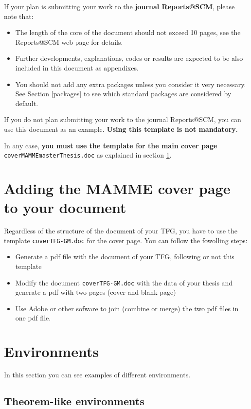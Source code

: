 \documentclass[12,twoside]{TFG-GM}
\theoremstyle{definition}
\theoremstyle{remark}
\begin{document}
If your plan is submitting your work to the \textbf{journal Reports@SCM}, please note that:
\begin{itemize}
	\item The length of the core of the document should not exceed 10 pages, see the Reports@SCM web page for details.
	\item Further developments, explanations, codes or results are expected to be also included in this document as appendixes.
	\item You should not add any extra packages unless you consider it very necessary. See Section \ref{packages} to see which standard packages  are considered by default. 
\end{itemize} 

If you do not plan submitting your work to the journal  Reports@SCM, you can use this document as an example. \textbf{Using this template is not mandatory}.
 
In any case, \textbf{you must use the template for the main cover page} \texttt{coverMAMMEmasterThesis.doc} as explained in section \ref{sec:coverPage}.


\section{Adding the MAMME cover page to your document}
\label{sec:coverPage}
  
Regardless of the structure of the document of your TFG, you have to use the template \texttt{coverTFG-GM.doc} for the cover page. You can follow the fowolling steps:
\begin{itemize}
	\item Generate a pdf file with the document of your TFG, following or not this template
	\item Modify the document \texttt{coverTFG-GM.doc} with the data of your thesis and generate a pdf with two pages (cover and blank page)
	\item Use Adobe or other sofware to join (combine or merge) the two pdf files in one pdf file. 
\end{itemize}
 
\section{Environments}

In this section you can see examples of different environments.

\subsection{Theorem-like environments}
\end{document}
